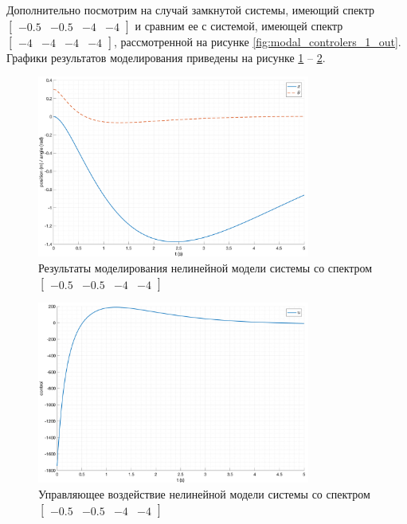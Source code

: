 \FloatBarrier
Дополнительно посмотрим на случай замкнутой системы, имеющий спектр $\begin{bmatrix}-0.5 & -0.5 & -4 &- 4\end{bmatrix}$
и сравним ее с системой, имеющей спектр $\begin{bmatrix}-4 & -4 & -4 &- 4\end{bmatrix}$, рассмотренной на рисунке \ref{fig:modal_controlers_1_out}.
Графики результатов моделирования приведены на рисунке \ref{fig:modal_controlers_5_out} -- \ref{fig:modal_controlers_5_u}. 
\begin{figure}[ht!]
    \centering
    \includegraphics[width=0.8\textwidth]{media/plots/modal_controllers/out_5.png}
    \caption{Результаты моделирования нелинейной модели системы со спектром $\begin{bmatrix}-0.5 & -0.5 & -4 &- 4\end{bmatrix}$}
    \label{fig:modal_controlers_5_out}
\end{figure}
\begin{figure}[ht!]
    \centering
    \includegraphics[width=0.8\textwidth]{media/plots/modal_controllers/u_5.png}
    \caption{Управляющее воздействие нелинейной модели системы со спектром $\begin{bmatrix}-0.5 & -0.5 & -4 &- 4\end{bmatrix}$}
    \label{fig:modal_controlers_5_u}
\end{figure}
